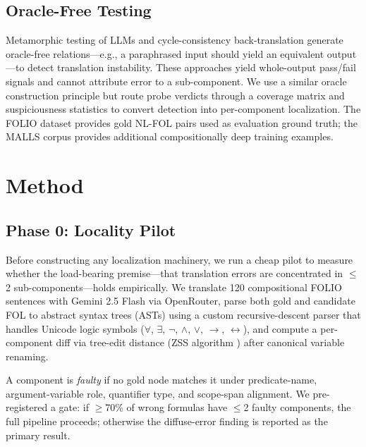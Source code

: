 \documentclass[11pt,letterpaper]{article}
\begin{document}
\subsection{Oracle-Free Testing}

Metamorphic testing of LLMs \citep{SoLT2025} and cycle-consistency back-translation \citep{CycleConsistency2024} generate oracle-free relations—e.g., a paraphrased input should yield an equivalent output—to detect translation instability. These approaches yield whole-output pass/fail signals and cannot attribute error to a sub-component. We use a similar oracle construction principle but route probe verdicts through a coverage matrix and suspiciousness statistics to convert detection into per-component localization. The FOLIO dataset \citep{Han2022} provides gold NL-FOL pairs used as evaluation ground truth; the MALLS corpus \citep{Yang2023} provides additional compositionally deep training examples.

\section{Method}
\label{sec:method}

\subsection{Phase 0: Locality Pilot}
\label{sec:phase0}

Before constructing any localization machinery, we run a cheap pilot to measure whether the load-bearing premise—that translation errors are concentrated in $\leq$2 sub-components—holds empirically. We translate 120 compositional FOLIO sentences \citep{Han2022} with Gemini 2.5 Flash via OpenRouter, parse both gold and candidate FOL to abstract syntax trees (ASTs) using a custom recursive-descent parser that handles Unicode logic symbols ($\forall$, $\exists$, $\neg$, $\wedge$, $\vee$, $\to$, $\leftrightarrow$), and compute a per-component diff via tree-edit distance (ZSS algorithm \citep{Zhang1989}) after canonical variable renaming.

A component is \emph{faulty} if no gold node matches it under predicate-name, argument-variable role, quantifier type, and scope-span alignment. We pre-registered a gate: if $\geq$70\% of wrong formulas have $\leq$2 faulty components, the full pipeline proceeds; otherwise the diffuse-error finding is reported as the primary result.
\end{document}

